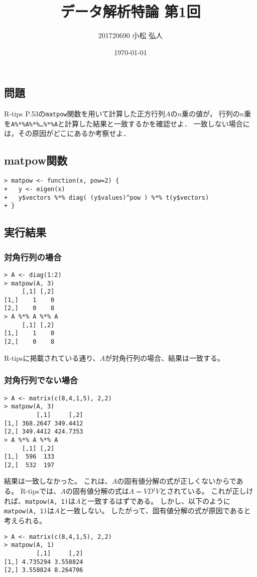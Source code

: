 \documentclass{jsarticle}
\title{データ解析特論 第1回}
\author{201720690 小松 弘人}
\date{\today}
\begin{document}
\maketitle
\thispagestyle{empty}
\subsection*{問題}
R-tips P.53の\verb|matpow|関数を用いて計算した正方行列$A$の$n$乗の値が，
行列の$n$乗を\verb|A%*%A%*%…%*%A|と計算した結果と一致するかを確認せよ．
一致しない場合には，その原因がどこにあるか考察せよ．

\subsection*{matpow関数}
\begin{lstlisting}[basicstyle=\ttfamily\footnotesize, frame=single]
> matpow <- function(x, pow=2) {
+   y <- eigen(x)
+   y$vectors %*% diag( (y$values)^pow ) %*% t(y$vectors)
+ }
\end{lstlisting}

\subsection*{実行結果}
\subsubsection*{対角行列の場合}
\begin{lstlisting}[basicstyle=\ttfamily\footnotesize, frame=single]
> A <- diag(1:2)
> matpow(A, 3)
     [,1] [,2]
[1,]    1    0
[2,]    0    8
> A %*% A %*% A
     [,1] [,2]
[1,]    1    0
[2,]    0    8
\end{lstlisting}
R-tipsに掲載されている通り、$A$が対角行列の場合、結果は一致する。

\subsubsection*{対角行列でない場合}
\begin{lstlisting}[basicstyle=\ttfamily\footnotesize, frame=single]
> A <- matrix(c(8,4,1,5), 2,2)
> matpow(A, 3)
         [,1]     [,2]
[1,] 368.2647 349.4412
[2,] 349.4412 424.7353
> A %*% A %*% A
     [,1] [,2]
[1,]  596  133
[2,]  532  197
\end{lstlisting}

結果は一致しなかった。
これは、$A$の固有値分解の式が正しくないからである。
R-tipsでは、$A$の固有値分解の式は$A = VD{}^t\!V$とされている。
これが正しければ、\verb|matpow(A, 1)|は$A$と一致するはずである。
しかし、以下のように\verb|matpow(A, 1)|は$A$と一致しない。
したがって、固有値分解の式が原因であると考えられる。
\begin{lstlisting}[basicstyle=\ttfamily\footnotesize, frame=single]
> A <- matrix(c(8,4,1,5), 2,2)
> matpow(A, 1)
         [,1]     [,2]
[1,] 4.735294 3.558824
[2,] 3.558824 8.264706
\end{lstlisting}
\end{document}
